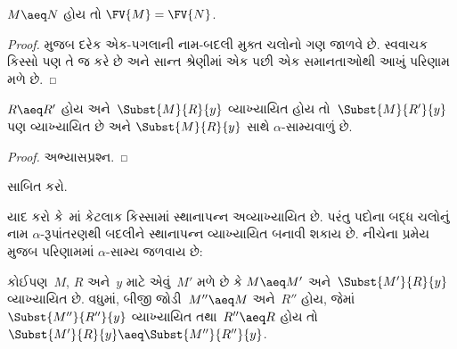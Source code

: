 \documentclass[../../../include/open-logic-section]{subfiles}
\begin{document}
\begin{thm}
  $M \aeq N$ હોય તો $\FV{M} = \FV{N}$.
\end{thm}

\begin{proof}
   મુજબ દરેક એક-પગલાની નામ-બદલી મુક્ત ચલોનો
  ગણ જાળવે છે. સ્વવાચક કિસ્સો પણ તે જ કરે છે અને સાન્ત
  શ્રેણીમાં એક પછી એક સમાનતાઓથી આખું પરિણામ મળે છે.
\end{proof}

\begin{lem}
  $R \aeq R'$ હોય અને~$\Subst{M}{R}{y}$ વ્યાખ્યાયિત હોય
  તો~$\Subst{M}{R'}{y}$ પણ વ્યાખ્યાયિત છે અને
  $\Subst{M}{R}{y}$ સાથે $\alpha$-સામ્યવાળું છે.
\end{lem}

\begin{proof}
  અભ્યાસપ્રશ્ન.
\end{proof}

\begin{prob}
   સાબિત કરો.
\end{prob}

યાદ કરો કે~માં કેટલાક કિસ્સામાં સ્થાનાપન્ન
અવ્યાખ્યાયિત છે. પરંતુ પદોના બદ્ધ ચલોનું નામ
$\alpha$-રૂપાંતરણથી બદલીને સ્થાનાપન્ન વ્યાખ્યાયિત બનાવી
શકાય છે. નીચેના પ્રમેય મુજબ પરિણામમાં $\alpha$-સામ્ય
જળવાય છે:

\begin{thm}
  કોઈપણ~$M$, $R$ અને~$y$ માટે એવું~$M'$ મળે છે કે
  $M \aeq M'$ અને~$\Subst{M'}{R}{y}$ વ્યાખ્યાયિત છે.
  વધુમાં, બીજી જોડી~$M'' \aeq M$ અને~$R''$ હોય, જેમાં
  $\Subst{M''}{R''}{y}$ વ્યાખ્યાયિત તથા~$R'' \aeq R$
  હોય તો
  $\Subst{M'}{R}{y} \aeq \Subst{M''}{R''}{y}$.
\end{thm}
\end{document}
